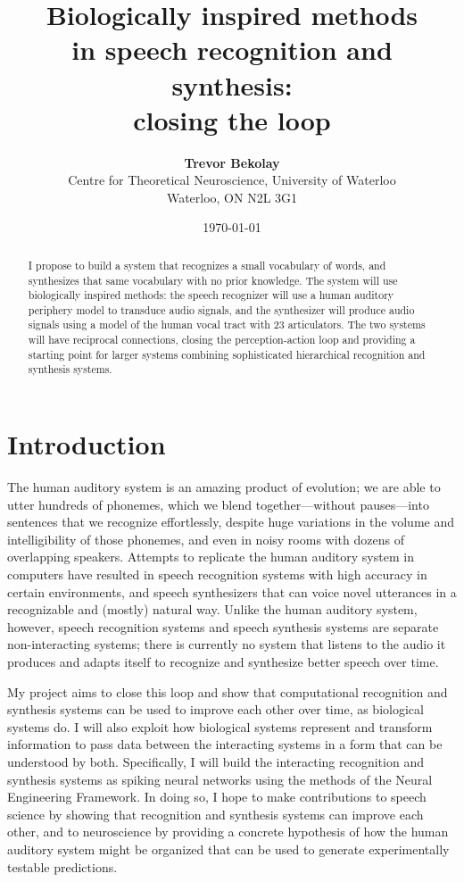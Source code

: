 \documentclass{article}
\title{\bf Biologically inspired methods \\
  in speech recognition and synthesis: \\
  closing the loop}
\date{\today}
\author{{\bf Trevor Bekolay} \\
  Centre for Theoretical Neuroscience, University of Waterloo \\
  Waterloo, ON  N2L 3G1}
\begin{document}
\maketitle

\begin{abstract}
  I propose to build a system that recognizes
  a small vocabulary of words,
  and synthesizes that same vocabulary
  with no prior knowledge.
  The system will use biologically inspired methods:
  the speech recognizer will use a
  human auditory periphery model
  to transduce audio signals,
  and the synthesizer will
  produce audio signals
  using a model of the human vocal tract
  with 23 articulators.
  The two systems will have
  reciprocal connections,
  closing the perception-action loop
  and providing a starting point for
  larger systems combining
  sophisticated hierarchical
  recognition and synthesis systems.
\end{abstract}

\section{Introduction}
\label{sec:intro}

The human auditory system is an
amazing product of evolution;
we are able to utter hundreds of phonemes,
which we blend together---without pauses---into
sentences that we recognize effortlessly,
despite huge variations in the
volume and intelligibility of
those phonemes,
and even in noisy rooms with
dozens of overlapping speakers.
Attempts to replicate the human auditory system
in computers have resulted in
speech recognition systems with
high accuracy in certain environments,
and speech synthesizers that
can voice novel utterances
in a recognizable and
(mostly) natural way.
Unlike the human auditory system, however,
speech recognition systems
and speech synthesis systems
are separate non-interacting systems;
there is currently no system
that listens to the audio it produces
and adapts itself to recognize
and synthesize better speech over time.

My project aims to close this loop
and show that computational
recognition and synthesis systems
can be used to improve each other over time,
as biological systems do.
I will also exploit how biological systems
represent and transform information
to pass data between the interacting systems
in a form that can be understood by both.
Specifically, I will build the interacting
recognition and synthesis systems
as spiking neural networks using the
methods of the Neural Engineering Framework.
In doing so, I hope to make contributions
to speech science by showing that
recognition and synthesis systems
can improve each other,
and to neuroscience by providing
a concrete hypothesis of how
the human auditory system
might be organized
that can be used to generate
experimentally testable predictions.
\end{document}
